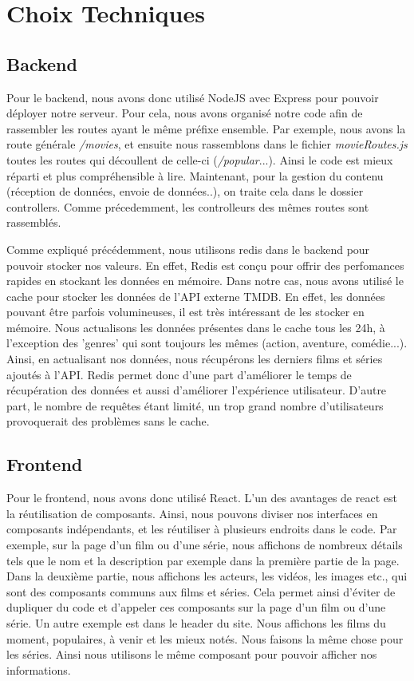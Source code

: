\documentclass[a4paper]{article}
\begin{document}
\section{Choix Techniques}

\subsection{Backend}
Pour le backend, nous avons donc utilisé NodeJS avec Express pour pouvoir déployer notre serveur. Pour cela, nous avons organisé notre code afin de rassembler les routes ayant le même préfixe ensemble. Par exemple, nous avons la route générale \textit{/movies}, et ensuite nous rassemblons dans le fichier \textit{movieRoutes.js} toutes les routes qui découllent de celle-ci (\textit{/popular}...). Ainsi le code est mieux réparti et plus compréhensible à lire. Maintenant, pour la gestion du contenu (réception de données, envoie de données..), on traite cela dans le dossier controllers. Comme précedemment, les controlleurs des mêmes routes sont rassemblés.

Comme expliqué précédemment, nous utilisons redis dans le backend pour pouvoir stocker nos valeurs. En effet, Redis est conçu pour offrir des perfomances rapides en stockant les données en mémoire. Dans notre cas, nous avons utilisé le cache pour stocker les données de l'API externe TMDB. En effet, les données pouvant être parfois volumineuses, il est très intéressant de les stocker en mémoire. Nous actualisons les données présentes dans le cache tous les 24h, à l'exception des 'genres' qui sont toujours les mêmes (action, aventure, comédie...). Ainsi, en actualisant nos données, nous récupérons les derniers films et séries ajoutés à l'API. Redis permet donc d'une part d'améliorer le temps de récupération des données et aussi d'améliorer l'expérience utilisateur. D'autre part, le nombre de requêtes étant limité, un trop grand nombre d'utilisateurs provoquerait des problèmes sans le cache.

\subsection{Frontend}
Pour le frontend, nous avons donc utilisé React. L'un des avantages de react est la réutilisation de composants. Ainsi, nous pouvons diviser nos interfaces en composants indépendants, et les réutiliser à plusieurs endroits dans le code. Par exemple, sur la page d'un film ou d'une série, nous affichons de nombreux détails tels que le nom et la description par exemple dans la première partie de la page. Dans la deuxième partie, nous affichons les acteurs, les vidéos, les images etc., qui sont des composants communs aux films et séries. Cela permet ainsi d'éviter de dupliquer du code et d'appeler ces composants sur la page d'un film ou d'une série. Un autre exemple est dans le header du site. Nous affichons les films du moment, populaires, à venir et les mieux notés. Nous faisons la même chose pour les séries. Ainsi nous utilisons le même composant pour pouvoir afficher nos informations.
\end{document}
